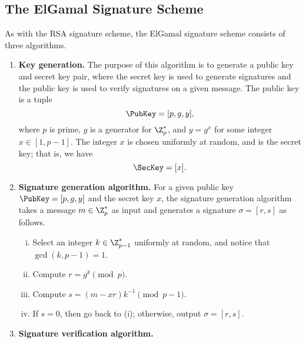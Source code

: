 \subsection{The ElGamal Signature Scheme}
As with the RSA signature scheme, the ElGamal signature scheme consists of three algorithms. 
\begin{enumerate}
    \item \textbf{Key generation.} The purpose of this algorithm is to generate 
    a public key and secret key pair, where the secret key is used to generate 
    signatures and the public key is used to verify signatures on a given message. 
    The public key is a tuple 
    \[ \PubKey = [p, g, y], \] 
    where $p$ is prime, $g$ is a generator for $\Z_p^*$, and $y = g^x$ for some 
    integer $x \in [1, p-1]$. The integer $x$ is chosen uniformly at random, 
    and is the secret key; that is, we have 
    \[ \SecKey = [x]. \] 

    \item \textbf{Signature generation algorithm.} For a given public key 
    $\PubKey = [p, g, y]$ and the secret key $x$, the signature generation 
    algorithm takes a message $m \in \Z_p^*$ as input and generates a 
    signature $\sigma = [r, s]$ as follows. 
    \begin{enumerate}[(i)]
        \item Select an integer $k \in \Z_{p-1}^*$ uniformly at random, and notice 
        that $\gcd(k, p-1) = 1$. 
        \item Compute $r = g^k \pmod p$. 
        \item Compute $s = (m - xr)k^{-1} \pmod{p-1}$. 
        \item If $s = 0$, then go back to (i); otherwise, output $\sigma = [r, s]$. 
    \end{enumerate}

    \item \textbf{Signature verification algorithm.} 
\end{enumerate}